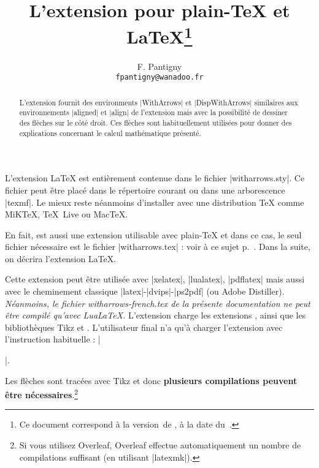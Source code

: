 \documentclass[dvipsnames]{article}%
\begin{document}
\VerbatimFootnotes

\title{L'extension  pour plain-TeX et LaTeX\thanks{Ce document correspond à la 
version~\myfileversion\space de , à la date du~\myfiledate.}} 
\author{F. Pantigny \\ \texttt{fpantigny@wanadoo.fr}}  

\maketitle


\begin{abstract}
L'extension  fournit des environments |{WithArrows}| et |{DispWithArrows}|
similaires aux environnements |{aligned}| et |{align}| de l'extension  mais
avec la possibilité de dessiner des flèches sur le côté droit. Ces flèches sont
habituellement utilisées pour donner des explications concernant le calcul mathématique
présenté.
\end{abstract}


\vspace{1cm} L'extension LaTeX  est entièrement contenue dans le fichier
|witharrows.sty|. Ce fichier peut être placé dans le répertoire courant ou dans une
arborescence |texmf|. Le mieux reste néanmoins d'installer  avec une
distribution TeX comme MiKTeX, TeX~Live ou MacTeX.

\medskip
En fait,  est aussi une extension utilisable avec plain-TeX et dans ce
cas, le seul fichier nécessaire est le fichier |witharrows.tex| : voir à ce sujet
p.~\pageref{plain-TeX}. Dans la suite, on décrira l'extension LaTeX.

\medskip
Cette extension peut être utilisée avec |xelatex|, |lualatex|, |pdflatex| mais aussi avec
le cheminement classique |latex|-|dvips|-|ps2pdf| (ou Adobe Distiller). \textsl{Néanmoins,
  le fichier witharrows-french.tex de la présente documentation ne peut être compilé
  qu'avec LuaLaTeX.} L'extension  charge les extensions ,
 ainsi que les bibliothèques Tikz  et .
L'utilisateur final n'a qu'à charger l'extension  avec l'instruction
habituelle : |\usepackage{witharrows}|.

\medskip
Les flèches sont tracées avec Tikz et donc \textbf{plusieurs compilations peuvent être
  nécessaires}.\footnote{Si vous utilisez Overleaf, Overleaf effectue automatiquement un
  nombre de compilations suffisant (en utilisant |latexmk|).}
\end{document}
